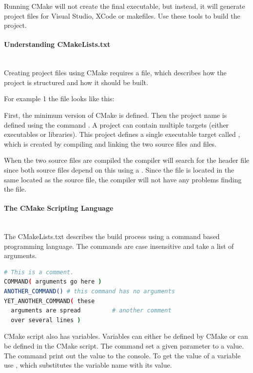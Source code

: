 \documentclass[11pt,a4paper,landscape]{scrartcl} %
\newcommand{\sectiontitle}[1]{\paragraph{#1} \ \\} %
\begin{document}
\begin{multicols}{2}
Running CMake will not create the final executable, but instead, it will generate project files for Visual Studio, XCode or makefiles. Use these tools to build the project.

\sectiontitle{Understanding CMakeLists.txt}

Creating project files using CMake requires a  file, which describes how the project is structured and how it should be built.

For example 1 the file looks like this: 



First, the minimum version of CMake is defined. Then the project name is defined using the command . A project can contain multiple targets (either executables or libraries). This project defines a single executable target called , which is created by compiling and linking the two source files  and  files.

When the two source files are compiled the compiler will search for the header file  since both source files depend on this using a . Since the file is located in the same located as the source file, the compiler will not have any problems finding the file.

\sectiontitle{The CMake Scripting Language}

The CMakeLists.txt describes the build process using a command based programming language. The commands are case insensitive and take a list of arguments.

\begin{lstlisting}[language=bash]
# This is a comment.
COMMAND( arguments go here )
ANOTHER_COMMAND() # this command has no arguments
YET_ANOTHER_COMMAND( these
  arguments are spread         # another comment 
  over several lines )
\end{lstlisting}

CMake script also has variables. Variables can either be defined by CMake or can be defined in the CMake script.  The command  set a given parameter to a value. The command  print out the value to the console. To get the value of a variable use , which substitutes the variable name with its value.




\end{multicols}
\end{document}
